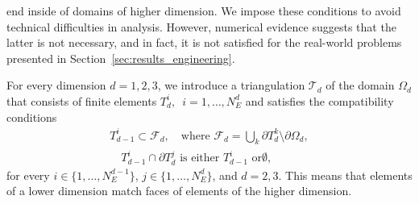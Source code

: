  end inside of domains of higher dimension. We impose these
conditions to avoid technical difficulties in analysis. However, numerical
evidence suggests that the latter is not necessary, and in fact, it is not
satisfied for the real-world problems presented in
Section~\ref{sec:results_engineering}.

For every dimension $d=1,2,3$, we introduce a triangulation $\mathcal{T}_{d}$
of the domain $\Omega_{d}$ that consists of finite elements $T_{d}^{i},$\ $i =
1,\dots,N_{E}^{d}$ and satisfies the compatibility conditions
\begin{gather}
T_{d-1}^{i} \subset\mathcal{F}_{d}, \quad\text{where } \mathcal{F}_{d}=
\bigcup_{k} \partial T_{d}^{k} \setminus\partial\Omega_{d},\\
\quad T_{d-1}^{i} \cap\partial T^{j}_{d} \text{ is either $T_{d-1}^{i}$ or
$\emptyset$},
\end{gather}
for every $i\in\{1,\dots, N_{E}^{d-1}\}$, $j\in\{1,\dots,N_{E}^{d}\}$, and
$d=2,3$.
This means that elements of a lower dimension match faces of elements of the higher dimension.

